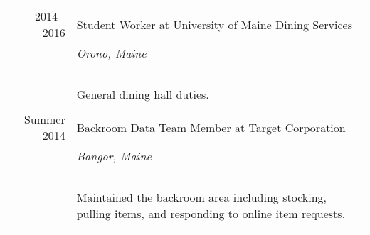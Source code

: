 \documentclass[a4paper,10pt]{article}
\begin{document}
\begin{tabular}{r p{11cm}}\footnotesize{2014 - 2016} &Student Worker at {\setmainfont{smallcaps.otf}University of Maine Dining Services} \\&\emph{\setmainfont{HoeflerText Italic.otf}Orono, Maine} \\~\\&{General dining hall duties.}\\\multicolumn{2}{c}{} \\
 
 

 
 
 \footnotesize{Summer 2014} &Backroom Data Team Member at {\setmainfont{smallcaps.otf}Target Corporation} \\&\emph{\setmainfont{HoeflerText Italic.otf}Bangor,  Maine}\\~\\&{ Maintained the backroom area including stocking,  pulling items, and responding to online item requests.}\\\multicolumn{2}{c}{} \\
 
 


\end{tabular}






\end{document}
